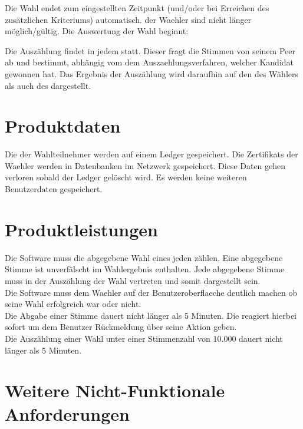 \documentclass[parskip=full,11pt,twoside]{scrartcl}
\begin{document}
Die \gls{Wahl} endet zum eingestellten Zeitpunkt (und/oder bei Erreichen des zusätzlichen Kriteriums) automatisch.  der \gls{Waehler} sind nicht länger möglich/gültig. Die Auswertung der \gls{Wahl} beginnt:

Die Auszählung findet in jedem  statt. Dieser fragt die Stimmen von seinem \gls{Peer} ab und bestimmt, abhängig vom dem \gls{Auszaehlungsverfahren}, welcher \gls{Kandidat} gewonnen hat. Das Ergebnis der Auszählung wird daraufhin auf den  des Wählers als auch des  dargestellt.

\section{Produktdaten}

Die  der Wahlteilnehmer werden auf einem \gls{Ledger} gespeichert.
Die \glspl{Zertifikat} der \gls{Waehler} werden in Datenbanken im Netzwerk gespeichert.
Diese Daten gehen verloren sobald der \gls{Ledger} gelöscht wird. Es werden keine weiteren \gls{Benutzerdaten} gespeichert.

\section{Produktleistungen}
Die Software muss die abgegebene \gls{Wahl} eines jeden  zählen. Eine abgegebene Stimme ist unverfälscht im Wahlergebnis enthalten.
Jede abgegebene \gls{Stimme} muss in der Auszählung der \gls{Wahl} vertreten und somit dargestellt sein. \\
Die Software muss dem \gls{Waehler} auf der \gls{Benutzeroberflaeche} deutlich machen ob seine \gls{Wahl} erfolgreich war oder nicht. \\
Die Abgabe einer \gls{Stimme} dauert nicht länger als 5 Minuten.
Die  reagiert hierbei sofort um dem \gls{Benutzer} Rückmeldung über seine Aktion geben. \\
Die Auszählung einer \gls{Wahl} unter einer Stimmenzahl von 10.000  dauert nicht länger als 5 Minuten.

\section{Weitere Nicht-Funktionale Anforderungen}
\end{document}
